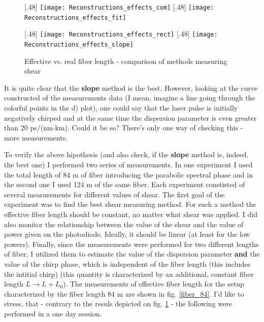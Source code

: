 \documentclass{article}
\begin{document}
\begin{figure}[h!]

\caption{Effective vs. real fiber length - comparison of methods measuring shear}
[.48\linewidth]{%
\texttt{[image: Reconstructions\_effects\_com]}%
}%
\hfill
{}[.48\linewidth]{%
\texttt{[image: Reconstructions\_effects\_fit]}%
}

\vfill

[.48\linewidth]{%
\texttt{[image: Reconstructions\_effects\_rect]}%
}%
\hfill
{}[.48\linewidth]{%
\texttt{[image: Reconstructions\_effects\_slope]}%
}
\label{historic measurements}
\end{figure}

It is quite clear that the \textbf{slope} method is the best. However, looking at the curve constructed of the measurements data (I mean, imagine a line going through the colorful points in the d) plot), one could say that the laser pulse is initially negatively chirped and at the same time the dispersion parameter is even greater than 20 ps/(nm$\cdot$km).  Could it be so? There's only one way of checking this - more measurements.

To verify the above hipothesis (and also check, if the \textbf{slope} method is, indeed, the best one) I performed two series of measurements. In one experiment I used the total length of 84 m of fiber introducing the parabolic spectral phase and in the second one I used 124 m of the same fiber. Each experiment constisted of several measurements for different values of shear. The first goal of the experiment was to find the best shear measuring method. For such a method the effective fiber length should be constant, no matter what shear was applied. I did also monitor the relationship between the value of the shear and the value of power given on the photodiode. Ideally, it should be linear (at least for the low powers). Finally, since the measurements were performed for two different lengths of fiber, I utilized them to estimate the value of the dispersion parameter \textbf{and} the value of the chirp phase, which is independent of the fiber length (this includes the intitial chirp) (this quantity is characterized by an additional, constant fiber length $L\to L+L_0$). The measurements of effective fiber length for the setup characterized by the fiber length 84 m are shown in fig. \ref{fiber_84}. I'd like to stress, that - contrary to the resuls depicted on fig. \ref{historic measurements} - the following were performed in a one day session.
 
\end{document}
